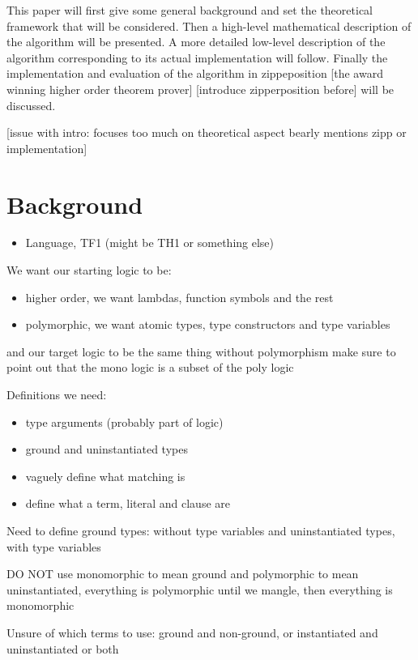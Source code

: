 \documentclass{article}
\begin{document}
\begin{itemize}
       This paper will first give some general background and set the theoretical framework that will be considered. Then a high-level mathematical description of the algorithm will be presented. A more detailed low-level description of the algorithm corresponding to its actual implementation will follow.
       Finally the implementation and evaluation of the algorithm in zippeposition [the award winning higher order theorem prover] [introduce zipperposition before] will be discussed.

       [issue with intro: focuses too much on theoretical aspect bearly mentions zipp or implementation]
\end{itemize}

\section{Background}

\begin{itemize}
    \item Language, TF1 (might be TH1 or something else)
\end{itemize}

We want our starting logic to be:
\begin{itemize}
    \item higher order, we want lambdas, function symbols and the rest
    \item polymorphic, we want atomic types, type constructors and type variables
\end{itemize}
and our target logic to be the same thing without polymorphism make sure to point out that the mono logic is a subset of the poly logic


Definitions we need:
\begin{itemize}
   \item type arguments (probably part of logic)
   \item ground and uninstantiated types 
   \item vaguely define what matching is
   \item define what a term, literal and clause are
\end{itemize}
Need to define ground types: without type variables and uninstantiated types, with type variables

DO NOT use monomorphic to mean ground and polymorphic to mean uninstantiated, everything is polymorphic until we mangle, then everything is monomorphic

Unsure of which terms to use: ground and non-ground, or instantiated and uninstantiated or both
\end{document}
